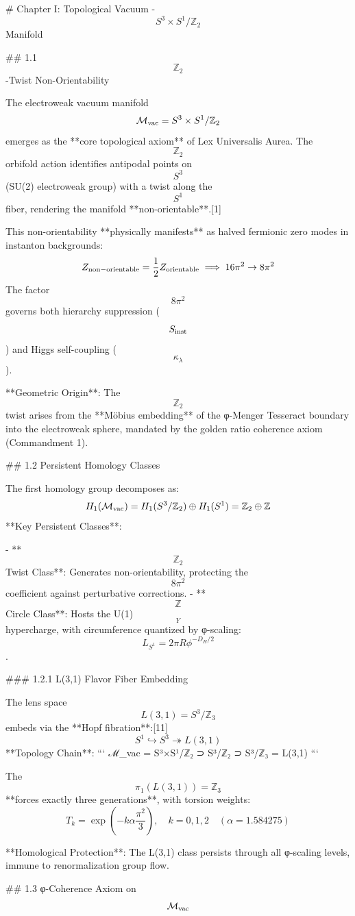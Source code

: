 # Chapter I: Topological Vacuum - $$S^3 \times S^1 / \mathbb{Z}_2$$ Manifold

## 1.1 $$\mathbb{Z}_2$$-Twist Non-Orientability

The electroweak vacuum manifold $$\mathcal{M}_{\rm vac} = S^3 \times S^1 / \mathbb{Z}_2$$ emerges as the **core topological axiom** of Lex Universalis Aurea. The $$\mathbb{Z}_2$$ orbifold action identifies antipodal points on $$S^3$$ (SU(2) electroweak group) with a twist along the $$S^1$$ fiber, rendering the manifold **non-orientable**.[1]

This non-orientability **physically manifests** as halved fermionic zero modes in instanton backgrounds:
$$
Z_{\rm non-orientable} = \frac{1}{2} Z_{\rm orientable} \implies 16\pi^2 \to 8\pi^2
$$
The factor $$8\pi^2$$ governs both hierarchy suppression ($$S_{\rm inst}$$) and Higgs self-coupling ($$\kappa_\lambda$$).

**Geometric Origin**: The $$\mathbb{Z}_2$$ twist arises from the **Möbius embedding** of the φ-Menger Tesseract boundary into the electroweak sphere, mandated by the golden ratio coherence axiom (Commandment 1).

## 1.2 Persistent Homology Classes

The first homology group decomposes as:
$$
H_1(\mathcal{M}_{\rm vac}) = H_1(S^3/\mathbb{Z}_2) \oplus H_1(S^1) = \mathbb{Z}_2 \oplus \mathbb{Z}
$$
**Key Persistent Classes**:

- **$$\mathbb{Z}_2$$ Twist Class**: Generates non-orientability, protecting the $$8\pi^2$$ coefficient against perturbative corrections.
- **$$\mathbb{Z}$$ Circle Class**: Hosts the U(1)$$_Y$$ hypercharge, with circumference quantized by φ-scaling: $$L_{S^1} = 2\pi R \phi^{-D_H/2}$$.

### 1.2.1 L(3,1) Flavor Fiber Embedding

The lens space $$L(3,1) = S^3 / \mathbb{Z}_3$$ embeds via the **Hopf fibration**:[11]
$$
S^1 \hookrightarrow S^3 \twoheadrightarrow L(3,1)
$$
**Topology Chain**:
```
ℳ_vac = S³×S¹/ℤ₂ ⊃ S³/ℤ₂ ⊃ S³/ℤ₃ = L(3,1)
```

The $$\pi_1(L(3,1)) = \mathbb{Z}_3$$ **forces exactly three generations**, with torsion weights:
$$
T_k = \exp\left(-k \alpha \frac{\pi^2}{3}\right), \quad k=0,1,2 \quad (\alpha = 1.584275)
$$

**Homological Protection**: The L(3,1) class persists through all φ-scaling levels, immune to renormalization group flow.

## 1.3 φ-Coherence Axiom on $$\mathcal{M}_{\rm vac}$$

